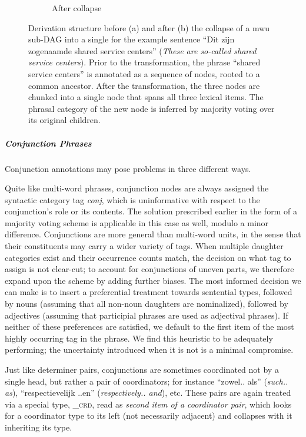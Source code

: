 \begin{figure}[t]
\begin{subfigure}[t]{0.43\textwidth}
        \caption{After collapse}
    \end{subfigure}
    \caption[Multi-Word Unit Collapse]{Derivation structure before (a) and after (b) the collapse of a mwu sub-DAG into a single for the example sentence ``Dit zijn zogenaamde shared service centers'' (\textit{These are so-called shared service centers}). Prior to the transformation, the phrase ``shared service centers'' is annotated as a sequence of nodes, rooted to a common ancestor. After the transformation, the three nodes are chunked into a single node that spans all three lexical items. The phrasal category of the new node is inferred by majority voting over its original children.}
    \label{fig:mwu}
\end{figure}

\subparagraph{Conjunction Phrases}
Conjunction annotations may pose problems in three different ways.

Quite like multi-word phrases, conjunction nodes are always assigned the syntactic category tag \textit{conj}, which is uninformative with respect to the conjunction's role or its contents.
The solution prescribed earlier in the form of a majority voting scheme is applicable in this case as well, modulo a minor difference.
Conjunctions are more general than multi-word units, in the sense that their constituents may carry a wider variety of tags.
When multiple daughter categories exist and their occurrence counts match, the decision on what tag to assign is not clear-cut; to account for conjunctions of uneven parts, we therefore expand upon the scheme by adding further biases.
The most informed decision we can make is to insert a preferential treatment towards sentential types, followed by nouns (assuming that all non-noun daughters are nominalized), followed by adjectives (assuming that participial phrases are used as adjectival phrases).
If neither of these preferences are satisfied, we default to the first item of the most highly occurring tag in the phrase.
We find this heuristic to be adequately performing; the uncertainty introduced when it is not is a minimal compromise.

Just like determiner pairs, conjunctions are sometimes coordinated not by a single head, but rather a pair of coordinators; for instance ``zowel.. als'' (\textit{such.. as}), ``respectievelijk ..en'' (\textit{respectively.. and}), etc. 
These pairs are again treated via a special type, \textsc{\_crd}, read as \textit{second item of a coordinator pair}, which looks for a coordinator type to its left (not necessarily adjacent) and collapses with it inheriting its type.

